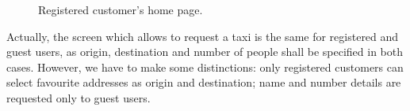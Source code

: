 \begin{figure}%
	\hfill%
	\hfill%
	\caption{Registered customer's home page.}\label{fig:logged}
\end{figure}

\newpage

Actually, the screen which allows to request a taxi is the same for registered and guest users, as origin, destination and number of people shall be specified in both cases. However, we have to make some distinctions: only registered customers can select favourite addresses as origin and destination; name and number details are requested only to guest users. 

